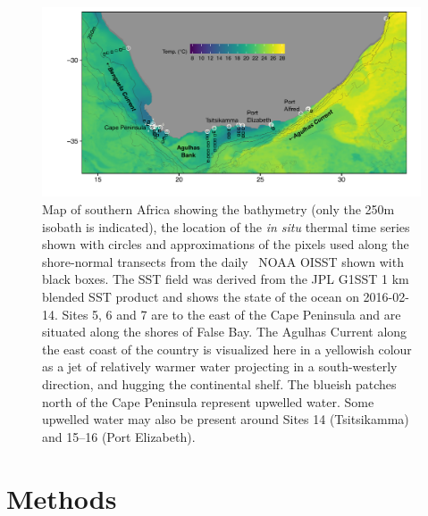 \documentclass[a4paper,10pt,review]{elsarticle}
\begin{document}
\begin{figure}
\includegraphics[width=1.0\textwidth]{figure1_1km_labeled.pdf}
\caption{Map of southern Africa showing the bathymetry (only the 250m isobath is indicated), the location of the \emph{in situ} thermal time series shown with circles and approximations of the pixels used along the shore-normal transects from the daily \degree~NOAA OISST \cite{Reynolds2007} shown with black boxes. The SST field was derived from the JPL G1SST 1 km blended SST product and shows the state of the ocean on 2016-02-14. Sites 5, 6 and 7 are to the east of the Cape Peninsula and are situated along the shores of False Bay. The Agulhas Current along the east coast of the country is visualized here in a yellowish colour as a jet of relatively warmer water projecting in a south-westerly direction, and hugging the continental shelf. The blueish patches north of the Cape Peninsula represent upwelled water. Some upwelled water may also be present around Sites 14 (Tsitsikamma) and 15--16 (Port Elizabeth).} \label{fig:Figure1}
\end{figure}

\section{Methods}
\end{document}
